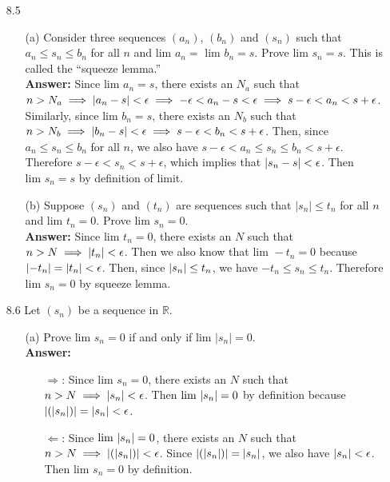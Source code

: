\documentclass{article}
\begin{document}
\begin{itemize}
      \item [8.5]
            \begin{itemize}
                  \item [(a)] Consider three sequences $(a_n)$, $(b_n)$ and $(s_n)$ such that $a_n\leq s_n\leq b_n$ for all $n$ and $\text{lim }a_n=$ $\text{lim }b_n=s$. Prove $\text{lim }s_n=s$. This is called the ``squeeze lemma.''\\
                        \textbf{Answer: } Since $\text{lim }a_n=s$, there exists an $N_a$ such that $n>N_a\implies\abs{a_n-s}<\epsilon\implies -\epsilon<a_n-s<\epsilon \implies s-\epsilon<a_n<s+\epsilon$. Similarly, since $\text{lim }b_n=s$, there exists an $N_b$ such that $n>N_b\implies\abs{b_n-s}<\epsilon\implies s-\epsilon<b_n<s+\epsilon$. Then, since $a_n\leq s_n\leq b_n$ for all $n$, we also have $s-\epsilon<a_n\leq s_n\leq b_n<s+\epsilon$. Therefore $s-\epsilon<s_n<s+\epsilon$, which implies that $\abs{s_n-s}<\epsilon$. Then $\text{lim }s_n=s$ by definition of limit.
                  \item [(b)] Suppose $(s_n)$ and $(t_n)$ are sequences such that $|s_n|\leq t_n$ for all $n$ and $\text{lim }t_n=0$. Prove $\text{lim }s_n=0$.\\
                        \textbf{Answer: } Since $\text{lim }t_n=0$, there exists an $N$ such that $n>N\implies \abs{t_n}<\epsilon$. Then we also know that $\text{lim }-t_n=0$ because $\abs{-t_n}=\abs{t_n}<\epsilon$. Then, since $\abs{s_n}\leq t_n$, we have $-t_n\leq s_n\leq t_n$. Therefore $\text{lim }s_n=0$ by squeeze lemma.
            \end{itemize}
      \item [8.6] Let $(s_n)$ be a sequence in $\mathbb{R}$.
            \begin{itemize}
                  \item [(a)] Prove $\text{lim }s_n=0$ if and only if $\text{lim }|s_n|=0$.\\
                        \textbf{Answer: }
                        \begin{itemize}
                              \item [$\Rightarrow$:] Since $\text{lim }s_n=0$, there exists an $N$ such that $n>N\implies\abs{s_n}<\epsilon$. Then $\text{lim }\abs{s_n}=0$ by definition because $\abs{(\abs{s_n})}=\abs{s_n}<\epsilon$.
                              \item [$\Leftarrow$:] Since $\text{lim }\abs{s_n}=0$, there exists an $N$ such that $n>N\implies\abs{(\abs{s_n})}<\epsilon$. Since $\abs{(\abs{s_n})}=\abs{s_n}$, we also have $\abs{s_n}<\epsilon$. Then $\text{lim }s_n=0$ by definition.

\end{itemize}
\end{itemize}
\end{itemize}
\end{document}
